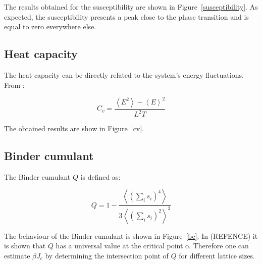 \documentclass[twoside]{article}
\def\mean#1{\left< #1 \right>}
\begin{document}
\begin{multicols}{2}
The results obtained for the susceptibility are shown in Figure~\ref{susceptibility}. As expected, the susceptibility presents a peak close to the phase transition and is equal to zero everywhere else.

\subsection{Heat capacity}
The heat capacity can be directly related to the system's energy fluctuations. From \cite{thijssen}:

\begin{equation}
C_v = \frac{\mean{E^2} - \mean{E}^2}{L^2 T}
\end{equation}

The obtained results are show in Figure~\ref{cv}.

\subsection{Binder cumulant}
The Binder cumulant $Q$ is defined as:

\begin{equation}
Q = 1 - \frac{\mean{\left( \sum_i s_i \right)^4}}{3 \mean{\left( \sum_i s_i \right)^2}^2}
\end{equation}

The behaviour of the Binder cumulant is shown in Figure~\ref{bc}. In (REFENCE) it is shown that $Q$ has a universal value at the critical point o. Therefore one can estimate $\beta J_c$ by determining the intersection point of $Q$ for different lattice sizes.


\end{multicols}
\end{document}
